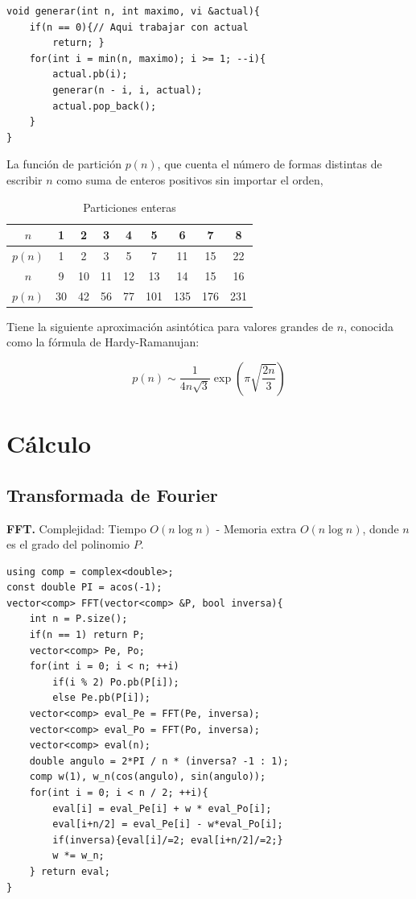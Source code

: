 \documentclass[10pt,spanish,mexico]{article}
\numberwithin{equation}{section}
\begin{document}
\begin{multicols}{2}
\begin{verbatim}
void generar(int n, int maximo, vi &actual){
    if(n == 0){// Aqui trabajar con actual
        return; }
    for(int i = min(n, maximo); i >= 1; --i){
        actual.pb(i);
        generar(n - i, i, actual);
        actual.pop_back();
    }
}
\end{verbatim}
La función de partición \( p(n) \), que cuenta el número de formas distintas de escribir \( n \) como suma de enteros positivos sin importar el orden,

\begin{table}[H]
	\centering
	\begin{tabular}{|c|cccccccc|}
		\hline
		$n$ & 1 & 2 & 3 & 4 & 5 & 6 & 7 & 8\\
		\hline
		$p(n)$ & 1 & 2 & 3 & 5 & 7 & 11 & 15 & 22\\
		\hline
		\hline
		$n$ & 9 & 10 & 11 & 12 & 13 & 14 & 15 & 16 \\
		\hline
		 $p(n)$ & 30 & 42 & 56 & 77 & 101 & 135 & 176 & 231\\
		\hline
	\end{tabular}
	\caption{Particiones enteras}
\end{table}

Tiene la siguiente aproximación asintótica para valores grandes de $n$, conocida como la fórmula de Hardy-Ramanujan:

\[
p(n) \sim \frac{1}{4n\sqrt{3}} \exp\left( \pi \sqrt{\frac{2n}{3}} \right)
\]


\hrulefill
\section{Cálculo}
\subsection{Transformada de Fourier}
\textbf{FFT.} Complejidad: Tiempo $O(n\log n)$ - Memoria extra $O(n\log n)$, donde $n$ es el grado del polinomio $P$.
\begin{verbatim}
using comp = complex<double>;
const double PI = acos(-1);
vector<comp> FFT(vector<comp> &P, bool inversa){
    int n = P.size();
    if(n == 1) return P;
    vector<comp> Pe, Po;
    for(int i = 0; i < n; ++i)
        if(i % 2) Po.pb(P[i]);
        else Pe.pb(P[i]);
    vector<comp> eval_Pe = FFT(Pe, inversa);
    vector<comp> eval_Po = FFT(Po, inversa);
    vector<comp> eval(n);
    double angulo = 2*PI / n * (inversa? -1 : 1);
    comp w(1), w_n(cos(angulo), sin(angulo));
    for(int i = 0; i < n / 2; ++i){
        eval[i] = eval_Pe[i] + w * eval_Po[i];
        eval[i+n/2] = eval_Pe[i] - w*eval_Po[i];
        if(inversa){eval[i]/=2; eval[i+n/2]/=2;}
        w *= w_n;
    } return eval;
}
\end{verbatim}


\end{multicols}
\end{document}
